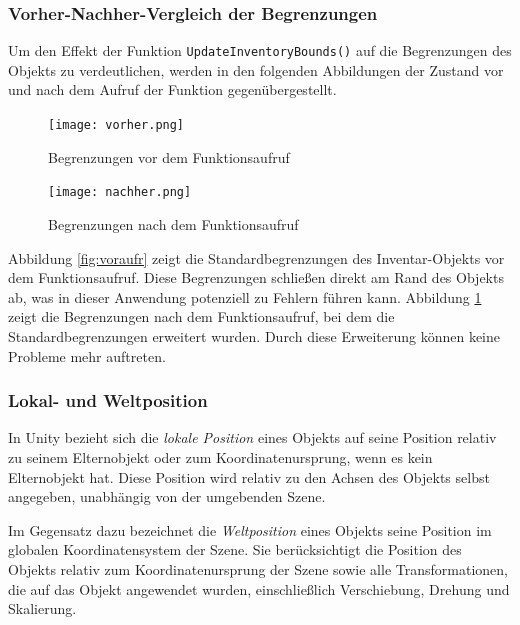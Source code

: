 \subsubsection*{Vorher-Nachher-Vergleich der Begrenzungen}
Um den Effekt der Funktion \texttt{UpdateInventoryBounds()} auf die Begrenzungen des Objekts zu verdeutlichen, werden
in den folgenden Abbildungen der Zustand vor und nach dem Aufruf der Funktion gegenübergestellt.

\begin{figure}[H]
    \centering
    \begin{minipage}[b]{0.45\textwidth}
        \centering
        \texttt{[image: vorher.png]}
        \caption{Begrenzungen vor dem Funktionsaufruf}
        \label{fig:voraufr}
    \end{minipage}
    \hfill
    \begin{minipage}[b]{0.45\textwidth}
        \centering
        \texttt{[image: nachher.png]}
        \caption{Begrenzungen nach dem Funktionsaufruf}
        \label{fig:nachaufr}
    \end{minipage}
\end{figure}

Abbildung \ref{fig:voraufr} zeigt die Standardbegrenzungen des Inventar-Objekts vor dem Funktionsaufruf. Diese Begrenzungen
schließen direkt am Rand des Objekts ab, was in dieser Anwendung potenziell zu Fehlern führen kann. Abbildung \ref{fig:nachaufr}
zeigt die Begrenzungen nach dem Funktionsaufruf, bei dem die Standardbegrenzungen erweitert wurden. Durch diese Erweiterung
können keine Probleme mehr auftreten.

\subsubsection*{Lokal- und Weltposition}
In Unity bezieht sich die \textit{lokale Position} eines Objekts auf seine Position relativ zu seinem Elternobjekt oder
zum Koordinatenursprung, wenn es kein Elternobjekt hat. Diese Position wird relativ zu den Achsen des Objekts selbst
angegeben, unabhängig von der umgebenden Szene.

Im Gegensatz dazu bezeichnet die \textit{Weltposition} eines Objekts seine Position im globalen Koordinatensystem der
Szene. Sie berücksichtigt die Position des Objekts relativ zum Koordinatenursprung der Szene sowie alle Transformationen,
die auf das Objekt angewendet wurden, einschließlich Verschiebung, Drehung und Skalierung.

